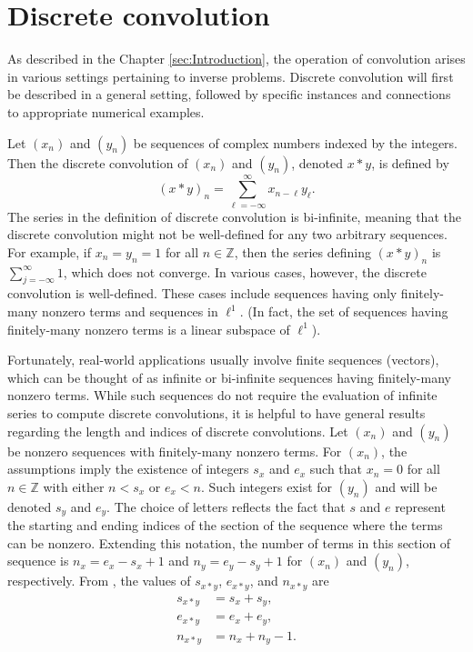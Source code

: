 \documentclass[12pt]{book}
\begin{document}
\section{Discrete convolution} \label{sec:Discrete convolution}
As described in the Chapter \ref{sec:Introduction}, the operation of convolution arises in various settings pertaining to inverse problems. Discrete convolution will first be described  in a general setting, followed by specific instances and connections to appropriate numerical examples. \par
Let $(x_n)$ and $(y_n)$ be sequences of complex numbers indexed by the integers. Then the discrete convolution of $(x_n)$ and $(y_n)$, denoted $x*y$, is defined by
\[(x*y)_n = \sum_{\ell=-\infty}^\infty x_{n-\ell}y_\ell.\]
The series in the definition of discrete convolution is bi-infinite, meaning that the discrete convolution might not be well-defined for any two arbitrary sequences. For example, if $x_n = y_n = 1$ for all $n \in \mathbb{Z}$, then the series defining $(x*y)_n$ is $\sum_{j=-\infty}^\infty 1$, which does not converge. In various cases, however, the discrete convolution is well-defined. These cases include sequences having only finitely-many nonzero terms and sequences in $\ell^1$. (In fact, the set of sequences having finitely-many nonzero terms is a linear subspace of $\ell^1$).  \par 
Fortunately, real-world applications usually involve finite sequences (vectors), which can be thought of as infinite or bi-infinite sequences having finitely-many nonzero terms. While such sequences do not require the evaluation of infinite series to compute discrete convolutions, it is helpful to have general results regarding the length and indices of discrete convolutions. Let $(x_n)$ and $(y_n)$ be nonzero sequences with finitely-many nonzero terms. For $(x_n)$, the assumptions imply the existence of integers $s_x$ and $e_x$ such that $x_n = 0$ for all $n \in \mathbb{Z}$ with either $n < s_x$ or $e_x < n$. Such integers exist for $(y_n)$ and will be denoted $s_y$ and $e_y$. The choice of letters reflects the fact that $s$ and $e$ represent the starting and ending indices of the section of the sequence where the terms can be nonzero. Extending this notation, the number of terms in this section of sequence is $n_x = e_x - s_x + 1$ and $n_y = e_y - s_y + 1$ for $(x_n)$ and $(y_n)$, respectively. From \cite{BoggessAlbert2001Afci}, the values of $s_{x*y}$, $e_{x*y}$, and $n_{x*y}$ are
\begin{align}
s_{x*y} &= s_x + s_y, \nonumber \\
e_{x*y} &= e_x + e_y, \label{eq:ConResults} \\
n_{x*y} &= n_x + n_y - 1. \nonumber
\end{align}
\end{document}
